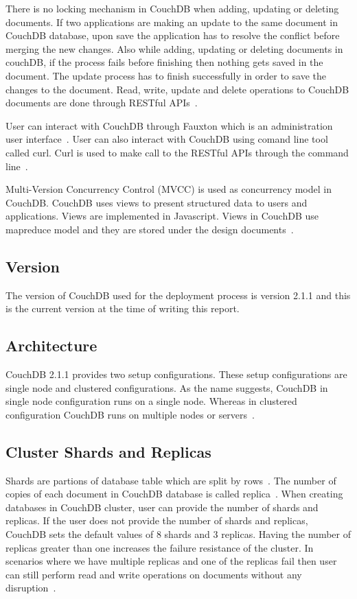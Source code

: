 There is no locking mechanism in CouchDB when adding,
updating or deleting documents. If two applications are making an
update to the same document in CouchDB database, upon save the
application has to resolve the conflict before merging the new
changes. Also while adding, updating or deleting documents in couchDB,
if the process fails before finishing then nothing gets saved in the
document. The update process has to finish successfully in order to
save the changes to the document. Read, write, update and delete
operations to CouchDB documents are done through RESTful
APIs~\cite{www-Couchdb}. 

User can interact with CouchDB through Fauxton which is
an administration user interface~\cite{www-Couchdb}. User can also
interact with CouchDB using  comand line tool called curl. Curl is
used to make call to the RESTful APIs through the command
line~\cite{www-CouchdbCurl}. 


Multi-Version Concurrency Control (MVCC) is used as concurrency model
in CouchDB. CouchDB uses views to present structured data to users and
applications. Views are implemented in Javascript. Views in CouchDB
use mapreduce model and they are stored under the design
documents~\cite{www-Couchdb}.  

\subsection{Version}
The version of CouchDB used for the deployment process is version 2.1.1 and this
is the current version at the time of writing this report.

\subsection{Architecture}
CouchDB 2.1.1 provides two setup configurations. These setup
configurations are single node and clustered configurations. As the
name suggests, CouchDB in single node configuration runs on a single
node. Whereas in clustered configuration CouchDB runs on multiple
nodes or servers~\cite{www-Couchdb, www-CouchdbOverview}.

\subsection{Cluster Shards and Replicas}

Shards are partions of database table which are split by
rows~\cite{www-WikiShard}. The number of copies of each document in
CouchDB database is called replica~\cite{www-CouchdbTheory}. When
creating databases in CouchDB cluster, user can provide the number of
shards and replicas. If the user does not provide the number of shards
and replicas, CouchDB sets the default values of 8 shards and 3
replicas. Having the number of replicas
greater than one increases the failure resistance of the cluster. In
scenarios where we have multiple replicas and one of the replicas fail
then user can still perform read and write operations on documents
without any disruption~\cite{www-CouchdbTheory}.

